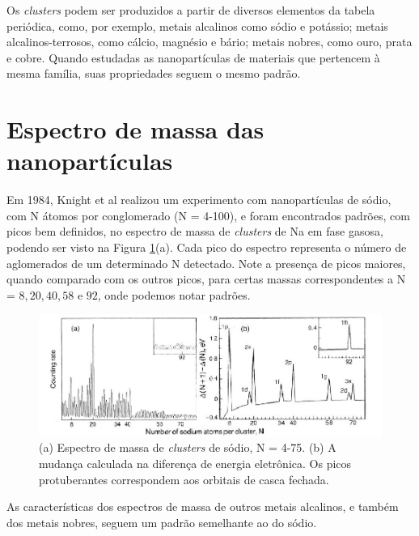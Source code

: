 Os \textit{clusters} podem ser produzidos a partir de diversos elementos da tabela periódica, como, por exemplo, metais alcalinos como sódio e potássio; metais alcalinos-terrosos, como cálcio, magnésio e bário; metais nobres, como ouro, prata  e cobre. Quando estudadas as nanopartículas de materiais que pertencem à mesma família, suas propriedades seguem o mesmo padrão.


\section{Espectro de massa das nanopartículas}
\label{sec:experimentos_teo}


Em 1984, Knight et al \cite{electronic_Shell_sodium} realizou um experimento com nanopartículas de sódio, com N átomos por conglomerado (N = 4-100), e foram encontrados padrões, com picos bem definidos, no espectro de massa de \textit{clusters} de Na em fase gasosa, podendo ser visto na Figura \ref{fig:espec_na}(a). Cada pico do espectro representa o número de 
aglomerados de um determinado N detectado. Note a presença de picos maiores, quando comparado com os outros picos, para certas massas correspondentes a N = $8, 20, 40, 58$ e $92$, onde podemos notar padrões. 




\begin{figure}
  \centering
  \includegraphics[width=1\textwidth]{images/clusters/NA_knight}
  \caption{(a) Espectro de massa de \textit{clusters} de sódio, N = 4-75.
  (b) A mudança calculada na diferença de energia eletrônica. Os picos protuberantes correspondem aos orbitais de casca fechada.\cite{electronic_Shell_sodium}  }
  \label{fig:espec_na}
\end{figure}


As características dos espectros de massa de outros metais alcalinos, e também dos metais nobres, seguem um padrão semelhante ao do sódio.

